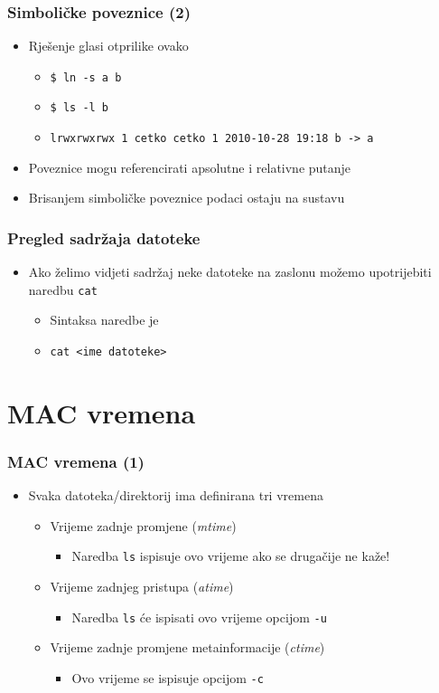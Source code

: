 \documentclass{beamer}
\newcommand{\shell}[1]{\texttt{\small #1}}
\begin{document}
\begin{frame}[t]
\frametitle{Simboličke poveznice (2)}
\begin{itemize}
  \item Rješenje glasi otprilike ovako
  \begin{itemize}
    \item[] \shell{\$ ln -s a b}
    \item[] \shell{\$ ls -l b}
    \item[] \shell{\footnotesize lrwxrwxrwx 1 cetko cetko 1 2010-10-28 19:18 b -> a}
  \end{itemize}
  \item Poveznice mogu referencirati apsolutne i relativne putanje
  \item Brisanjem simboličke poveznice podaci ostaju na sustavu
\end{itemize}
\end{frame}


\begin{frame}[t]
\frametitle{Pregled sadržaja datoteke}
\begin{itemize}
  \item Ako želimo vidjeti sadržaj neke datoteke na zaslonu možemo
        upotrijebiti naredbu \shell{cat}
  \begin{itemize}
    \item Sintaksa naredbe je
    \item[] \shell{cat \textless ime datoteke\textgreater}
  \end{itemize}
\end{itemize}
\end{frame}

\section{MAC vremena}
\begin{frame}[t]
\frametitle{MAC vremena (1)}
\begin{itemize}
  \item Svaka datoteka/direktorij ima definirana tri vremena
  \begin{itemize}
    \item Vrijeme zadnje promjene (\emph{mtime})
    \begin{itemize}
      \item Naredba \shell{ls} ispisuje ovo vrijeme ako se drugačije
               ne kaže!
    \end{itemize}
    \item Vrijeme zadnjeg pristupa (\emph{atime})
    \begin{itemize}
      \item Naredba \shell{ls} će ispisati ovo vrijeme opcijom
            \shell{-u}
    \end{itemize}
    \item Vrijeme zadnje promjene metainformacije (\emph{ctime})
    \begin{itemize}
      \item Ovo vrijeme se ispisuje opcijom \shell{-c}
    \end{itemize}
  \end{itemize}
\end{itemize}
\end{frame}
\end{document}
